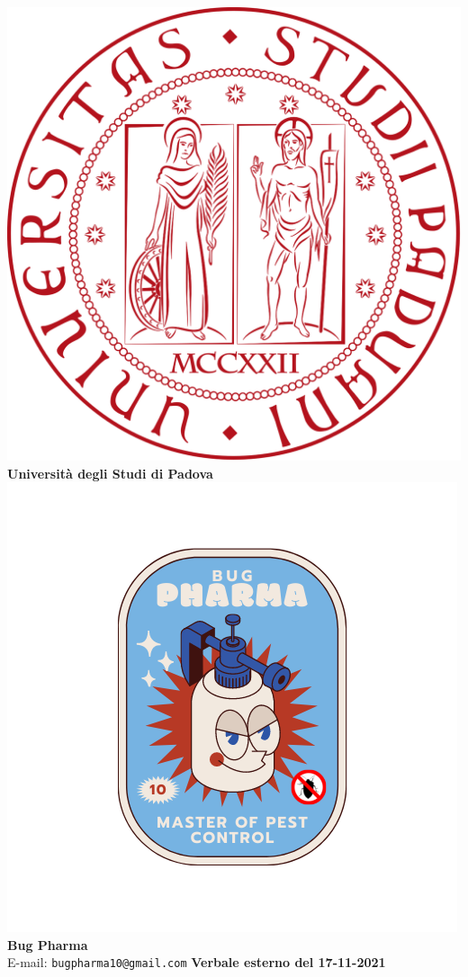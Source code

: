 \documentclass[11pt]{article}
\begin{document}
	\thispagestyle{empty}
	\begin{titlepage}
		\begin{center}
			\includegraphics[scale = 0.05]{../../Res/logo_unipd.png}\\
			\bigskip
			\large \textbf{Università degli Studi di Padova} \\
			\vfill
			\includegraphics[scale = 0.7]{../../Res/BugPharma_Logo.png}\\
			\large \textbf{Bug Pharma} \\
			\vfill
			\large
			E-mail: 
			\texttt{bugpharma10@gmail.com}
			\vfill
			\Huge \textbf{Verbale esterno del 17-11-2021}\\
			

\end{center}
\end{titlepage}
\end{document}
